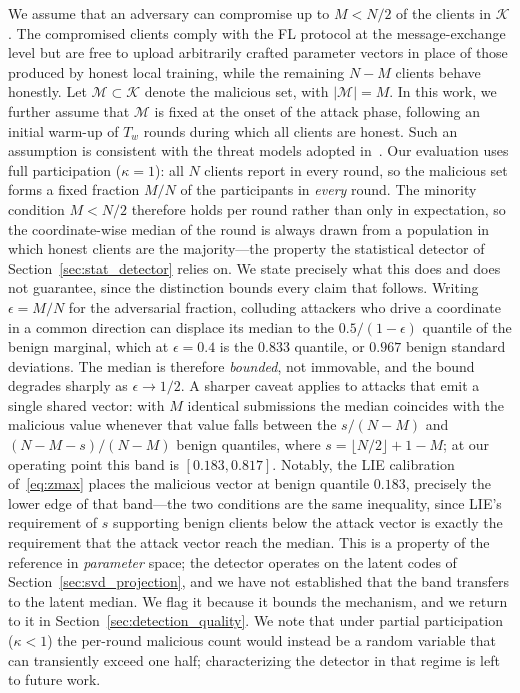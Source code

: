 \documentclass[journal]{IEEEtran}
\begin{document}
We assume that an adversary can compromise up to $M < N/2$ of the clients in $\mathcal{K}$. The compromised clients comply with the FL protocol at the message-exchange level but are free to upload arbitrarily crafted parameter vectors in place of those produced by honest local training, while the remaining $N - M$ clients behave honestly. Let $\mathcal{M} \subset \mathcal{K}$ denote the malicious set, with $|\mathcal{M}| = M$. In this work, we further assume that $\mathcal{M}$ is fixed at the onset of the attack phase, following an initial warm-up of $T_w$ rounds during which all clients are honest. Such an assumption is consistent with the threat models adopted in~\cite{baruch2019little, shejwalkar2021manipulating}. Our evaluation uses full participation ($\kappa=1$): all $N$ clients report in every round, so the malicious set forms a fixed fraction $M/N$ of the participants in \emph{every} round. The minority condition $M<N/2$ therefore holds per round rather than only in expectation, so the coordinate-wise median of the round is always drawn from a population in which honest clients are the majority---the property the statistical detector of Section~\ref{sec:stat_detector} relies on. We state precisely what this does and does not guarantee, since the distinction bounds every claim that follows. Writing $\epsilon = M/N$ for the adversarial fraction, colluding attackers who drive a coordinate in a common direction can displace its median to the $0.5/(1-\epsilon)$ quantile of the benign marginal, which at $\epsilon = 0.4$ is the $0.833$ quantile, or $0.967$ benign standard deviations. The median is therefore \emph{bounded}, not immovable, and the bound degrades sharply as $\epsilon \to 1/2$. A sharper caveat applies to attacks that emit a single shared vector: with $M$ identical submissions the median coincides with the malicious value whenever that value falls between the $s/(N-M)$ and $(N-M-s)/(N-M)$ benign quantiles, where $s = \lfloor N/2 \rfloor + 1 - M$; at our operating point this band is $[0.183, 0.817]$. Notably, the LIE calibration of~\eqref{eq:zmax} places the malicious vector at benign quantile $0.183$, precisely the lower edge of that band---the two conditions are the same inequality, since LIE's requirement of $s$ supporting benign clients below the attack vector is exactly the requirement that the attack vector reach the median. This is a property of the reference in \emph{parameter} space; the detector operates on the latent codes of Section~\ref{sec:svd_projection}, and we have not established that the band transfers to the latent median. We flag it because it bounds the mechanism, and we return to it in Section~\ref{sec:detection_quality}. We note that under partial participation ($\kappa<1$) the per-round malicious count would instead be a random variable that can transiently exceed one half; characterizing the detector in that regime is left to future work.
\end{document}
